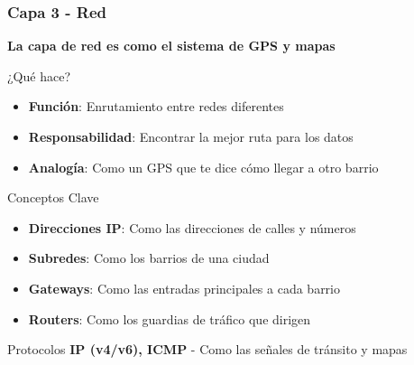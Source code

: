\documentclass[aspectratio=169]{beamer}
\begin{document}
            \begin{frame}
            \frametitle{Capa 3 - Red}
            
            \begin{center}
            \Large \textbf{La capa de red es como el sistema de GPS y mapas}
            \end{center}
            
        
            \begin{block}{¿Qué hace?}
            \begin{itemize}
            \item \textbf{Función}: Enrutamiento entre redes diferentes
            \item \textbf{Responsabilidad}: Encontrar la mejor ruta para los datos
            \item \textbf{Analogía}: Como un GPS que te dice cómo llegar a otro barrio
            \end{itemize}
            \end{block}
            
            \begin{block}{Conceptos Clave}
            \begin{itemize}
            \item \textbf{Direcciones IP}: Como las direcciones de calles y números
            \item \textbf{Subredes}: Como los barrios de una ciudad
            \item \textbf{Gateways}: Como las entradas principales a cada barrio
            \item \textbf{Routers}: Como los guardias de tráfico que dirigen
            \end{itemize}
            \end{block}
            
            
            \begin{block}{Protocolos}
            \textbf{IP (v4/v6), ICMP} - Como las señales de tránsito y mapas
            \end{block}
            \end{frame}
            
\end{document}
